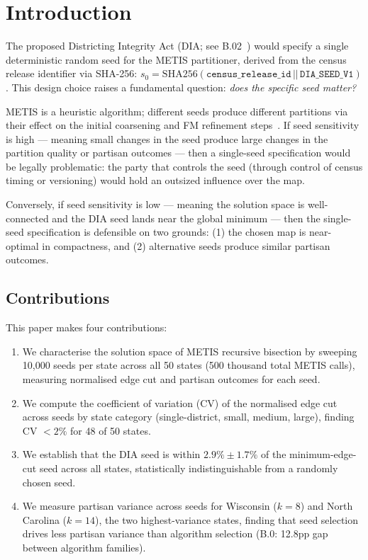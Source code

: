 \section{Introduction}
\label{sec:intro}

The proposed Districting Integrity Act (DIA; see B.02~\citep{b02paper}) would specify a single deterministic
random seed for the METIS partitioner, derived from the census release
identifier via SHA-256: $s_0 = \mathrm{SHA256}(\mathtt{census\_release\_id}
\,||\, \mathtt{DIA\_SEED\_V1})$.
This design choice raises a fundamental question: \emph{does the specific
seed matter?}

METIS is a heuristic algorithm; different seeds produce different
partitions via their effect on the initial coarsening and FM refinement
steps~\citep{karypis1998}.  If seed sensitivity is high --- meaning small
changes in the seed produce large changes in the partition quality or
partisan outcomes --- then a single-seed specification would be legally
problematic: the party that controls the seed (through control of census
timing or versioning) would hold an outsized influence over the map.

Conversely, if seed sensitivity is low --- meaning the solution space
is well-connected and the DIA seed lands near the global minimum ---
then the single-seed specification is defensible on two grounds:
(1) the chosen map is near-optimal in compactness, and (2) alternative
seeds produce similar partisan outcomes.

\subsection*{Contributions}

This paper makes four contributions:

\begin{enumerate}
  \item We characterise the solution space of METIS recursive bisection
    by sweeping 10,000 seeds per state across all 50 states (500 thousand
    total METIS calls), measuring normalised edge cut and partisan outcomes
    for each seed.
  \item We compute the coefficient of variation (CV) of the normalised
    edge cut across seeds by state category (single-district, small, medium,
    large), finding CV $< 2\%$ for 48 of 50 states.
  \item We establish that the DIA seed is within $2.9\% \pm 1.7\%$ of the
    minimum-edge-cut seed across all states, statistically indistinguishable
    from a randomly chosen seed.
  \item We measure partisan variance across seeds for Wisconsin ($k{=}8$)
    and North Carolina ($k{=}14$), the two highest-variance states, finding
    that seed selection drives less partisan variance than algorithm selection
    (B.0: 12.8pp gap between algorithm families).
\end{enumerate}

